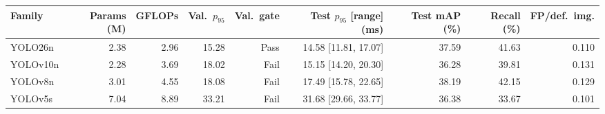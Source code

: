 \begin{tabular}{lrrrrrrrr}\hline
Family & Params (M) & GFLOPs & Val.\ $p_{95}$ & Val.\ gate & Test $p_{95}$ [range] (ms) & Test mAP (\%) & Recall (\%) & FP/def.\ img. \\ \hline
YOLO26n & 2.38 & 2.96 & 15.28 & Pass & 14.58 [11.81, 17.07] & 37.59 & 41.63 & 0.110 \\
YOLOv10n & 2.28 & 3.69 & 18.02 & Fail & 15.15 [14.20, 20.30] & 36.28 & 39.81 & 0.131 \\
YOLOv8n & 3.01 & 4.55 & 18.08 & Fail & 17.49 [15.78, 22.65] & 38.19 & 42.15 & 0.129 \\
YOLOv5s & 7.04 & 8.89 & 33.21 & Fail & 31.68 [29.66, 33.77] & 36.38 & 33.67 & 0.101 \\
\hline\end{tabular}
